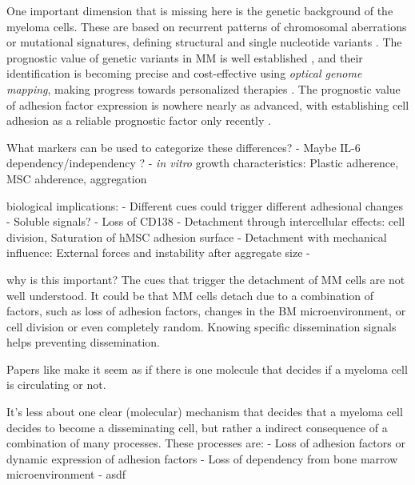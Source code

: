 One important dimension that is missing here is the genetic background of the
myeloma cells. These are based on recurrent patterns of chromosomal aberrations
or mutational signatures, defining structural and single nucleotide variants
\cite{kumarMultipleMyelomasCurrent2018a,
      hoangMutationalProcessesContributing2019}. The prognostic value of genetic
variants in MM is well established \cite{sharmaPrognosticRoleMYC2021}, and their
identification is becoming precise and cost-effective using \emph{optical
      genome mapping}, making progress towards personalized therapies
\cite{zouComprehensiveApproachEvaluate2024,
      budurleanIntegratingOpticalGenome2024}. The prognostic value of adhesion factor
expression is nowhere nearly as advanced, with establishing cell adhesion as a
reliable prognostic factor only recently
\cite{huDevelopmentCellAdhesionbased2024}.

What markers can be used to categorize these differences?
- Maybe IL-6 dependency/independency \cite{sprynskiRoleIGF1Major2009}?
- \textit{in vitro} growth characteristics: Plastic adherence, MSC ahderence, aggregation

\unnsubsection{\caddtriggertitle}%
\label{sec:discussion_caddtrigger}%

biological implications:
- Different cues could trigger different adhesional changes
- Soluble signals?
- Loss of CD138 \cite{akhmetzyanovaDynamicCD138Surface2020}
- Detachment through intercellular effects: cell division, Saturation of hMSC adhesion surface
- Detachment with mechanical influence: External forces and instability after aggregate size
-


why is this important?
The cues that trigger the detachment of MM cells are not well understood. It
could be that MM cells detach due to a combination of factors, such as loss of
adhesion factors, changes in the BM microenvironment, or cell division or
even completely random. Knowing specific dissemination signals helps preventing
dissemination.


Papers like \citet{akhmetzyanovaDynamicCD138Surface2020} make it seem as if
there is one molecule that decides if a myeloma cell is circulating or not.

It's less about one clear (molecular) mechanism that decides that a myeloma cell
decides to become a disseminating cell, but rather a indirect consequence of a
combination of many processes.
These processes are:
- Loss of adhesion factors or dynamic expression of adhesion factors
- Loss of dependency from bone marrow microenvironment
- asdf

